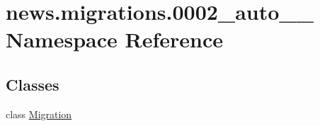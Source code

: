 \hypertarget{namespacenews_1_1migrations_1_10002__auto__20181009__2006}{}\section{news.\+migrations.0002\+\_\+auto\+\_\+\_ Namespace Reference}
\label{namespacenews_1_1migrations_1_10002__auto__20181009__2006}
\subsection*{Classes}
\begin{DoxyCompactItemize}
\item 
class \mbox{\hyperlink{classnews_1_1migrations_1_10002__auto__20181009__2006_1_1_migration}{Migration}}
\end{DoxyCompactItemize}
